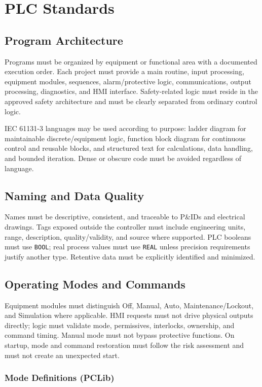 \chapter{PLC Standards}\label{ch:plc-standards}
\section{Program Architecture}
Programs must be organized by equipment or functional area with a documented execution order. Each project must provide a main routine, input processing, equipment modules, sequences, alarm/protective logic, communications, output processing, diagnostics, and HMI interface. Safety-related logic must reside in the approved safety architecture and must be clearly separated from ordinary control logic.

IEC 61131-3 languages may be used according to purpose: ladder diagram for maintainable discrete/equipment logic, function block diagram for continuous control and reusable blocks, and structured text for calculations, data handling, and bounded iteration. Dense or obscure code must be avoided regardless of language.

\section{Naming and Data Quality}
Names must be descriptive, consistent, and traceable to P\&IDs and electrical drawings. Tags exposed outside the controller must include engineering units, range, description, quality/validity, and source where supported. PLC booleans must use \texttt{BOOL}; real process values must use \texttt{REAL} unless precision requirements justify another type. Retentive data must be explicitly identified and minimized.

\section{Operating Modes and Commands}\label{sec:udt-modes}
Equipment modules must distinguish Off, Manual, Auto, Maintenance/Lockout, and Simulation where applicable. HMI requests must not drive physical outputs directly; logic must validate mode, permissives, interlocks, ownership, and command timing. Manual mode must not bypass protective functions. On startup, mode and command restoration must follow the risk assessment and must not create an unexpected start.

\subsection{Mode Definitions (PCLib)}\label{sec:pclib-modes}


